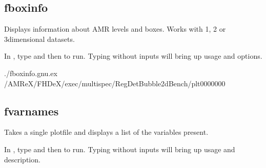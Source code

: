 \documentclass[letterpaper,10pt,english]{sphinxmanual}
\begin{document}
\begin{DUlineblock}{0em}
\item[] 
\end{DUlineblock}


\subsection{fboxinfo}
\label{\detokenize{Post_Processing:fboxinfo}}
\sphinxAtStartPar
Displays information about AMR levels and boxes. Works with
1\sphinxhyphen{}, 2\sphinxhyphen{} or 3\sphinxhyphen{}dimensional datasets.

\sphinxAtStartPar
{}

\sphinxAtStartPar
In , type  and then  to run.
Typing  without inputs will bring up usage and options.

\sphinxAtStartPar
{}

\begin{sphinxVerbatim}[commandchars=\\\{\}]
./fboxinfo.gnu.ex 
\PYGZti{}/AMReX/FHDeX/exec/multispec/Reg\PYGZus{}DetBubble\PYGZus{}2d\PYGZus{}Bench/plt0000000

\end{sphinxVerbatim}

\begin{DUlineblock}{0em}
\item[] 
\end{DUlineblock}


\subsection{fvarnames}
\label{\detokenize{Post_Processing:fvarnames}}
\sphinxAtStartPar
Takes a single plotfile and displays a list of the variables present.

\sphinxAtStartPar
{}

\sphinxAtStartPar
In , type  and then  to run.
Typing  without inputs will bring up usage and description.
\end{document}
